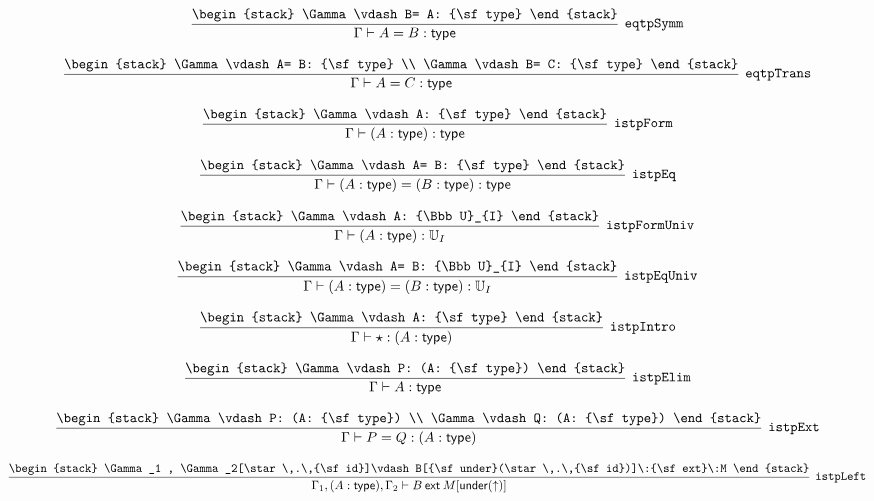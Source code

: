 \[
\infer[{\tt eqtpSymm}]{\Gamma \vdash A= B: {\sf type}}{
\begin{stack}
\Gamma \vdash B= A: {\sf type}
\end{stack}}
\]

\[
\infer[{\tt eqtpTrans}]{\Gamma \vdash A= C: {\sf type}}{
\begin{stack}
\Gamma \vdash A= B: {\sf type}
\\
\Gamma \vdash B= C: {\sf type}
\end{stack}}
\]

\[
\infer[{\tt istpForm}]{\Gamma \vdash (A: {\sf type}): {\sf type}}{
\begin{stack}
\Gamma \vdash A: {\sf type}
\end{stack}}
\]

\[
\infer[{\tt istpEq}]{\Gamma \vdash (A: {\sf type})= (B: {\sf type}): {\sf type}}{
\begin{stack}
\Gamma \vdash A= B: {\sf type}
\end{stack}}
\]

\[
\infer[{\tt istpFormUniv}]{\Gamma \vdash (A: {\sf type}): {\Bbb U}_{I}}{
\begin{stack}
\Gamma \vdash A: {\Bbb U}_{I}
\end{stack}}
\]

\[
\infer[{\tt istpEqUniv}]{\Gamma \vdash (A: {\sf type})= (B: {\sf type}): {\Bbb U}_{I}}{
\begin{stack}
\Gamma \vdash A= B: {\Bbb U}_{I}
\end{stack}}
\]

\[
\infer[{\tt istpIntro}]{\Gamma \vdash \star : (A: {\sf type})}{
\begin{stack}
\Gamma \vdash A: {\sf type}
\end{stack}}
\]

\[
\infer[{\tt istpElim}]{\Gamma \vdash A: {\sf type}}{
\begin{stack}
\Gamma \vdash P: (A: {\sf type})
\end{stack}}
\]

\[
\infer[{\tt istpExt}]{\Gamma \vdash P= Q: (A: {\sf type})}{
\begin{stack}
\Gamma \vdash P: (A: {\sf type})
\\
\Gamma \vdash Q: (A: {\sf type})
\end{stack}}
\]

\[
\infer[{\tt istpLeft}]{\Gamma_1 ,(A: {\sf type}), \Gamma_2 \vdash B\:{\sf ext}\:M[{\sf under}(\uparrow )]}{
\begin{stack}
\Gamma_1 , \Gamma_2[\star \,.\,{\sf id}]\vdash B[{\sf under}(\star \,.\,{\sf id})]\:{\sf ext}\:M
\end{stack}}
\]

